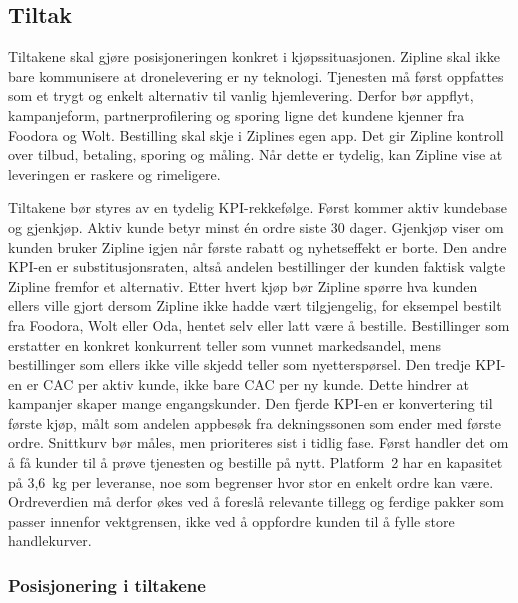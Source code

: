 \subsection{Tiltak}

Tiltakene skal gjøre posisjoneringen konkret i kjøpssituasjonen. Zipline skal
ikke bare kommunisere at dronelevering er ny teknologi. Tjenesten må først
oppfattes som et trygt og enkelt alternativ til vanlig hjemlevering. Derfor bør
appflyt, kampanjeform, partnerprofilering og sporing ligne det kundene kjenner fra
Foodora og Wolt. Bestilling skal skje i Ziplines egen app. Det gir Zipline
kontroll over tilbud, betaling, sporing og måling. Når dette er tydelig, kan
Zipline vise at leveringen er raskere og rimeligere.

Tiltakene bør styres av en tydelig KPI-rekkefølge. Først kommer aktiv
kundebase og gjenkjøp. Aktiv kunde betyr minst én ordre siste 30 dager.
Gjenkjøp viser om kunden bruker Zipline igjen når første rabatt og
nyhetseffekt er borte. Den andre KPI-en er substitusjonsraten, altså andelen bestillinger der
kunden faktisk valgte Zipline fremfor et alternativ. Etter hvert kjøp
bør Zipline spørre hva kunden ellers ville gjort dersom Zipline ikke
hadde vært tilgjengelig, for eksempel bestilt fra Foodora, Wolt eller
Oda, hentet selv eller latt være å bestille. Bestillinger som
erstatter en konkret konkurrent teller som vunnet markedsandel,
mens bestillinger som ellers ikke ville skjedd teller som
nyetterspørsel. Den
tredje KPI-en er CAC per aktiv kunde, ikke bare CAC per ny kunde. Dette
hindrer at kampanjer skaper mange engangskunder. Den fjerde KPI-en er
konvertering til første kjøp, målt som andelen appbesøk fra dekningssonen som
ender med første ordre. Snittkurv bør måles, men prioriteres sist i tidlig
fase. Først handler det om å få kunder til å prøve tjenesten og bestille på
nytt. Platform~2 har en kapasitet på 3{,}6~kg per leveranse, noe som
begrenser hvor stor en enkelt ordre kan være. Ordreverdien må derfor
økes ved å foreslå relevante tillegg og ferdige pakker som passer
innenfor vektgrensen, ikke ved å oppfordre kunden til å fylle store
handlekurver.

\subsubsection{Posisjonering i tiltakene}

